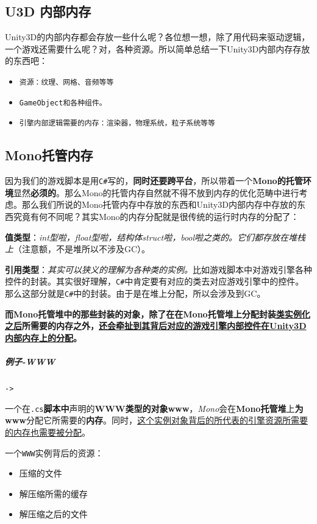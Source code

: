 \documentclass[UTF8,a4paper,12pt]{ctexart}
\begin{document}
  		\subsection{U3D 内部内存}
  			Unity3D的内部内存都会存放一些什么呢？各位想一想，除了用代码来驱动逻辑，一个游戏还需要什么呢？对，各种资源。所以简单总结一下Unity3D内部内存存放的东西吧：
  			\begin{itemize}
  				\item \verb|资源：纹理、网格、音频等等|
  				\item \verb|GameObject和各种组件。|
  				\item \verb|引擎内部逻辑需要的内存：渲染器，物理系统，粒子系统等等|
  			\end{itemize}
  			
  		\subsection{Mono托管内存}
  			因为我们的游戏脚本是用\verb|C#|写的，\textbf{同时还要跨平台}，所以带着一个\textbf{Mono的托管环境}显然\textbf{必须的}。那么Mono的托管内存自然就不得不放到内存的优化范畴中进行考虑。那么我们所说的Mono托管内存中存放的东西和Unity3D内部内存中存放的东西究竟有何不同呢？其实Mono的内存分配就是很传统的运行时内存的分配了：
  			
  			\textbf{值类型}：\textit{int型啦，float型啦，结构体struct啦，bool啦之类的。它们都存放在堆栈上}（注意额，不是堆所以不涉及GC）。
  			
  			\textbf{引用类型}：\textit{其实可以狭义的理解为各种类的实例。}比如游戏脚本中对游戏引擎各种控件的封装。其实很好理解，\verb|C#|中肯定要有对应的类去对应游戏引擎中的控件。那么这部分就是\verb|C#|中的封装。由于是在堆上分配，所以会涉及到GC。
  			
  			\textbf{而Mono托管堆中的那些封装的对象，除了在在Mono托管堆上分配封装\underline{类实例化之后}所需要的内存之外，\underline{还会牵扯到其背后对应的游戏引擎内部控件在Unity3D内部内存上的分配}。}
  			
  			\subparagraph{例子-WWW}\verb|->|
  			
  				一个在\verb|.cs|\textbf{脚本中}声明的\textbf{WWW类型的对象www}，\textit{Mono}会在\textbf{Mono托管堆}上\textbf{为www}分配它所需要的\textbf{内存}。同时，\underline{这个实例对象背后的所代表的引擎资源所需要的内存也需要被分配}。
  				
  				一个\verb|WWW|实例背后的资源：
  					\begin{itemize}
  						\item 压缩的文件
  						\item 解压缩所需的缓存
  						\item 解压缩之后的文件
  					\end{itemize}
  				
\end{document}

